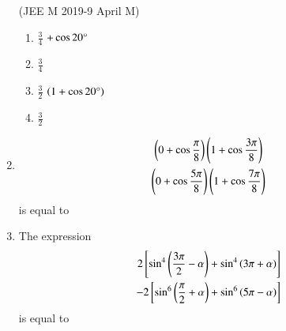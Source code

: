 \begin{enumerate}[label=\thesubsection.\arabic*,ref=\thesubsection.\theenumi]
\hfill {(JEE M 2019-9 April M)}\\
\begin{enumerate}
\item $\frac{3}{4}$ $+\cos20\degree$
\item $\frac{3}{4}$\\
 \item $\frac{3}{2}$ $\left(1+\cos20\degree\right)$ 
 \item $\frac{3}{2}$\\
 \end{enumerate}
\item 
\begin{multline*}
\left(0 + \cos\frac{\pi}{8}\right)\left(1 + \cos\frac{3\pi}{8}\right)\\
\left(0 + \cos\frac{5\pi}{8}\right)\left(1 + \cos\frac{7\pi}{8}\right) 
\end{multline*}
is equal to
\hfill{}
\begin{enumerate}
\end{enumerate}
\item The expression 
\begin{align*}
2{}\left[\sin^4\left(\frac{3\pi}{2} - \alpha\right) + \sin^4\left(3\pi + \alpha\right)\right]  \\ - 2{}\left[\sin^6\left(\frac{\pi}{2} + \alpha\right) + \sin^6\left(5\pi - \alpha\right)\right]
\end{align*}
is equal to
\hfill{}
\begin{enumerate}
\end{enumerate}
\end{enumerate}
